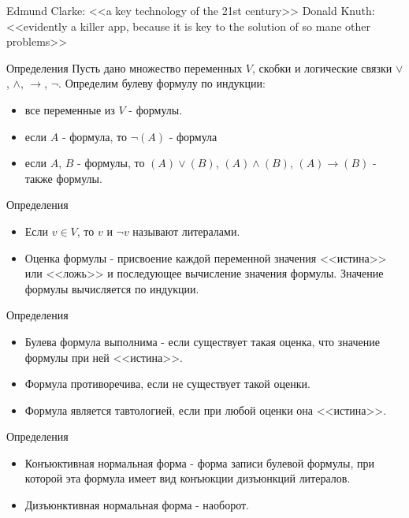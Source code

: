 \documentclass{beamer}
\begin{document}
\begin{frame}
Edmund Clarke: <<a key technology of the 21st century>>\newline
Donald Knuth: <<evidently a killer app, because it is key to the solution of so mane other problems>>\newline
\end{frame}

\begin{frame}{Определения}
Пусть дано множество переменных $V$, скобки и логические связки $\vee$, $\wedge$, $\rightarrow$, $\lnot$. Определим булеву
формулу по индукции:
\begin{itemize}
\item все переменные из $V$ - формулы.
\item если $A$ - формула, то $\lnot(A)$ - формула
\item если $A$, $B$ - формулы, то $(A)\vee(B)$, $(A)\wedge(B)$, $(A)\rightarrow(B)$ - также формулы.
\end{itemize}
\end{frame}

\begin{frame}{Определения}
\begin{itemize}
\item Если $v \in V$, то $v$ и $\lnot v$ называют литералами.
\item Оценка формулы - присвоение каждой переменной значения <<истина>> или <<ложь>> и последующее вычисление значения формулы. Значение
формулы вычисляется по индукции.
\end{itemize}
\end{frame}

\begin{frame}{Определения}
\begin{itemize}
\item Булева формула выполнима - если существует такая оценка, что значение формулы при ней <<истина>>.
\item Формула противоречива, если не
существует такой оценки.
\item Формула является тавтологией, если при любой оценки она <<истина>>.
\end{itemize}
\end{frame}

\begin{frame}{Определения}
\begin{itemize}
\item Конъюктивная нормальная форма - форма записи булевой формулы, при которой эта формула имеет вид конъюкции дизъюнкций
литералов.
\item Дизъюнктивная нормальная форма - наоборот.
\end{itemize}
\end{frame}
\end{document}
